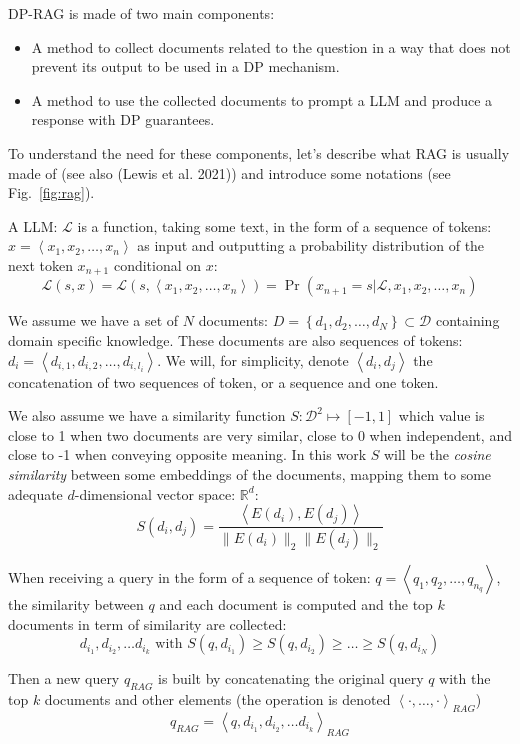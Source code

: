 \documentclass[
  12pt,
  a4paper,
]{article}
\providecommand{\tightlist}{%
  \setlength{\itemsep}{0pt}\setlength{\parskip}{0pt}}
\begin{document}
DP-RAG is made of two main components:

\begin{itemize}
\tightlist
\item
  A method to collect documents related to the question in a way that
  does not prevent its output to be used in a DP mechanism.
\item
  A method to use the collected documents to prompt a LLM and produce a
  response with DP guarantees.
\end{itemize}

To understand the need for these components, let's describe what RAG is
usually made of (see also (Lewis et al. 2021)) and introduce some
notations (see Fig.~\ref{fig:rag}).

A LLM: \(\mathcal{L}\) is a function, taking some text, in the form of a
sequence of tokens: \(x = \left<x_1, x_2, \ldots, x_n\right>\) as input
and outputting a probability distribution of the next token \(x_{n+1}\)
conditional on \(x\):
\[\mathcal{L}(s, x) = \mathcal{L}(s, \left<x_1, x_2, \ldots, x_n\right>) = \Pr(x_{n+1} = s | \mathcal{L}, x_1, x_2, \ldots, x_n)\]

We assume we have a set of \(N\) documents:
\(D = \left\{d_1, d_2, \ldots, d_N\right\} \subset \mathcal{D}\)
containing domain specific knowledge. These documents are also sequences
of tokens: \(d_i = \left<d_{i,1}, d_{i,2}, \ldots, d_{i,l_i}\right>\).
We will, for simplicity, denote \(\left<d_i, d_j\right>\) the
concatenation of two sequences of token, or a sequence and one token.

We also assume we have a similarity function
\(S: \mathcal{D}^2 \mapsto [-1, 1]\) which value is close to 1 when two
documents are very similar, close to 0 when independent, and close to -1
when conveying opposite meaning. In this work \(S\) will be the
\emph{cosine similarity} between some embeddings of the documents,
mapping them to some adequate \(d\)-dimensional vector space:
\(\mathbb{R}^d\):
\[S(d_i, d_j) = \frac{\left<E(d_i), E(d_j)\right>}{\|E(d_i)\|_2\|E(d_j)\|_2}\]

When receiving a query in the form of a sequence of token:
\(q = \left<q_1, q_2, \ldots, q_{n_q}\right>\), the similarity between
\(q\) and each document is computed and the top \(k\) documents in term
of similarity are collected:
\[d_{i_1}, d_{i_2}, \ldots d_{i_k} \text{ with } S(q, d_{i_1}) \geq S(q, d_{i_2}) \geq \ldots \geq S(q, d_{i_N})\]

Then a new query \(q_{RAG}\) is built by concatenating the original
query \(q\) with the top \(k\) documents and other elements (the
operation is denoted \(\left<\cdot, \ldots ,\cdot\right>_{RAG}\))
\[q_{RAG} = \left<q, d_{i_1}, d_{i_2}, \ldots d_{i_k}\right>_{RAG}\]
\end{document}
